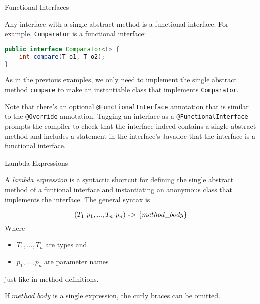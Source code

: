 \documentclass{beamer}
\begin{document}
\begin{frame}[fragile]{Functional Interfaces}

Any interface with a single abstract method is a functional interface.  For example, {\tt Comparator} is a functional interface:

\begin{lstlisting}[language=Java]
public interface Comparator<T> {
    int compare(T o1, T o2);
}
\end{lstlisting}

As in the previous examples, we only need to implement the single abstract method {\tt compare} to make an instantiable class that implements {\tt Comparator}.\\

\vspace{.05in}

Note that there's an optional {\tt @FunctionalInterface} annotation that is similar to the {\tt @Override} annotation.  Tagging an interface as a {\tt @FunctionalInterface} prompts the compiler to check that the interface indeed contains a single abstract method and includes a statement in the interface's Javadoc that the interface is a functional interface.

\end{frame}

\begin{frame}[fragile]{Lambda Expressions}

A {\it lambda expression} is a syntactic shortcut for defining the single abstract method of a funtional interface and instantiating an anonymous class that implements the interface.  The general syntax is

\[
(T_1 \hspace{.05in} p_1, ..., T_n \hspace{.05in} p_n) \hspace{.05in} \text{->} \hspace{.05in} \{ method\_body \}
\]
Where
\begin{itemize}
\item $T_1, ..., T_n$ are types and
\item $p_1, ..., p_n$ are parameter names
\end{itemize}
just like in method definitions.\\

\vspace{.05in}

If $method\_body$ is a single expression, the curly braces can be omitted.


\end{frame}
\end{document}
